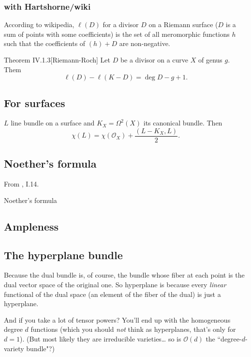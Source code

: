 \subsubsection{with Hartshorne/wiki}


According to wikipedia, \(\ell(D)\) for a divisor \(D\) on a Riemann surface (\(D\) is a sum of points with some coefficients) is the set of all meromorphic functions \(h\) such that the coefficients of \((h)+D\) are non-negative.
\begin{thing4}{Theorem IV.1.3}[Riemann-Roch]\label{prop:IV.1.3}\leavevmode
Let \(D\) be a divisor on a curve \(X\) of genus \(g\). Them
\[\ell(D)-\ell(K-D)=\operatorname{deg}D-g+1.\]
\end{thing4}

\subsection{For surfaces}
\begin{thm}[K3 course]\leavevmode
\(L\) line bundle on a surface and \(K_X=\Omega^2(X)\) its canonical bundle. Then
\[\chi(L)=\chi(\mathcal{O}_X)+\frac{(L-K_X,L)}{2}.\]
\end{thm}

\subsection{Noether's formula}

From \cite{beauville}, I.14.

\begin{thing7}{Noether's formula}\leavevmode
\end{thing7}

\subsection{Ampleness}

\subsection{The hyperplane bundle}
\begin{upshot}\leavevmode
Because the dual bundle is, of course, the bundle whose fiber at each point is the dual vector space of the original one. So hyperplane is because every \textit{linear}  functional of the dual space (an element of the fiber of the dual) is just a hyperplane.

And if you take a lot of tensor powers? You'll end up with the homogeneous degree \(d\) functions (which you should \textit{not} think as hyperplanes, that's only for \(d=1\)). (But most likely they are irreducible varieties… so is \(\mathcal{O}(d)\) the ``degree-\(d\)-variety bundle"?)
\end{upshot}

